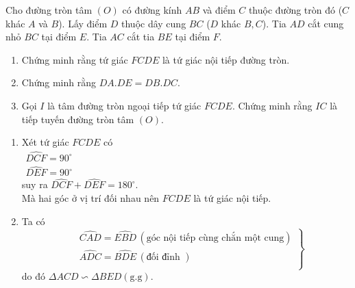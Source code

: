 \begin{ex}%
    Cho đường tròn tâm $(O)$ có đường kính $AB$ và điểm $C$ thuộc đường tròn đó ($C$ khác $A$ và $B$). Lấy điểm $D$ thuộc dây cung $BC$ ($D$ khác $B, C$). Tia $AD$ cắt cung nhỏ $BC$ tại điểm $E$. Tia $AC$ cắt tia $BE$ tại điểm $F$.
    \begin{enumerate}
        \item Chứng minh rằng tứ giác $FCDE$ là tứ giác nội tiếp đường tròn.
        \item Chứng minh rằng $DA.DE=DB.DC$.
        \item Gọi $I$ là tâm đường tròn ngoại tiếp tứ giác $FCDE$. Chứng minh rằng $IC$ là tiếp tuyến đường tròn tâm $(O)$.
    \end{enumerate}
\loigiai
    {
    \begin{center}
    \end{center}
    \begin{enumerate}
        \item Xét tứ giác $FCDE$ có \\
        $
        \begin{aligned}
        \widehat{DCF}=90^\circ\, \\
        \widehat{DEF}=90^\circ\, 
        \end{aligned}
        $\\
        suy ra $ \widehat{DCF}+ \widehat{DEF}=180^\circ$.\\
        Mà hai góc ở vị trí đối nhau nên $FCDE$ là tứ giác nội tiếp.
        \item Ta có
        $$
        \left.
        \begin{aligned}
        &\widehat{CAD}=\widehat{EBD}\, (\mbox{góc nội tiếp cùng chắn một cung})\\
        &\widehat{ADC}=\widehat{BDE}\, (\mbox{đối đỉnh })\\
        \end{aligned} 
        \right\} 
        $$
         do đó $ \Delta ACD \backsim  \Delta BED (\mbox{g.g})$.
            

\end{enumerate}}
\end{ex}

